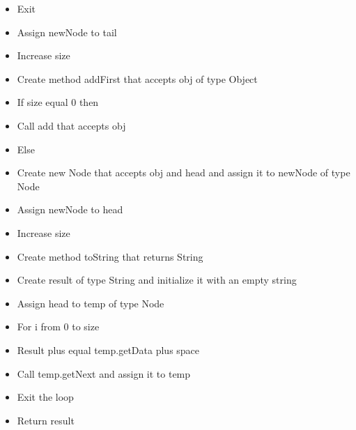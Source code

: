 \begin{itemize}
	\item Exit
	\item Assign newNode to tail
	\item Increase size
	\item Create method addFirst that accepts obj of type Object
	\item If size equal 0 then
	\item Call add that accepts obj
	\item Else
	\item Create new Node that accepts obj and head and assign it to newNode of type Node
	\item Assign newNode to head
	\item Increase size
	\item Create method toString that returns String
	\item Create result of type String and initialize it with an empty string
	\item Assign head to temp of type Node
	\item For i from 0 to size
	\item Result plus equal temp.getData plus space
	\item Call temp.getNext and assign it to temp
	\item Exit the loop
	\item Return result
\end{itemize}
